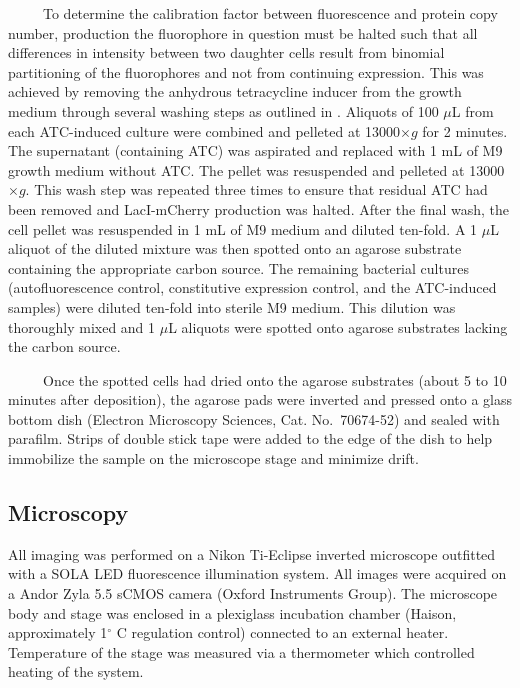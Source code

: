\documentclass[12pt]{caltech_thesis}
\begin{document}
~~~~~To determine the calibration factor between fluorescence and
protein copy number, production the fluorophore in question must be
halted such that all differences in intensity between two daughter cells
result from binomial partitioning of the fluorophores and not from
continuing expression. This was achieved by removing the anhydrous
tetracycline inducer from the growth medium through several washing
steps as outlined in \textcite{brewster2014}. Aliquots of 100 \(\mu\)L
from each ATC-induced culture were combined and pelleted at
13000\(\times g\) for 2 minutes. The supernatant (containing ATC) was
aspirated and replaced with 1 mL of M9 growth medium without ATC. The
pellet was resuspended and pelleted at 13000\(\times g\). This wash step
was repeated three times to ensure that residual ATC had been removed
and LacI-mCherry production was halted. After the final wash, the cell
pellet was resuspended in 1 mL of M9 medium and diluted ten-fold. A 1
\(\mu\)L aliquot of the diluted mixture was then spotted onto an agarose
substrate containing the appropriate carbon source. The remaining
bacterial cultures (autofluorescence control, constitutive expression
control, and the ATC-induced samples) were diluted ten-fold into sterile
M9 medium. This dilution was thoroughly mixed and 1 \(\mu\)L aliquots
were spotted onto agarose substrates lacking the carbon source.

~~~~~Once the spotted cells had dried onto the agarose substrates (about
5 to 10 minutes after deposition), the agarose pads were inverted and
pressed onto a glass bottom dish (Electron Microscopy Sciences, Cat.
No.~70674-52) and sealed with parafilm. Strips of double stick tape were
added to the edge of the dish to help immobilize the sample on the
microscope stage and minimize drift.

\hypertarget{microscopy}{%
\subsection{Microscopy}\label{microscopy}}

All imaging was performed on a Nikon Ti-Eclipse inverted microscope
outfitted with a SOLA LED fluorescence illumination system. All images
were acquired on a Andor Zyla 5.5 sCMOS camera (Oxford Instruments
Group). The microscope body and stage was enclosed in a plexiglass
incubation chamber (Haison, approximately 1\(^\circ\) C regulation
control) connected to an external heater. Temperature of the stage was
measured via a thermometer which controlled heating of the system.
\end{document}
